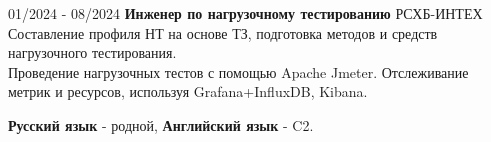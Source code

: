 \documentclass[9pt]{developercv} %
\begin{document}



\vspace{-10 pt}
\begin{entrylist}
    \entry
		{01/2024 - 08/2024}
		{{\textbf{Инженер по нагрузочному тестированию}}}
		{РСХБ-ИНТЕХ}
		{Составление профиля НТ на основе ТЗ, подготовка методов и средств нагрузочного тестирования.\\
            Проведение нагрузочных тестов с помощью Apache Jmeter. Отслеживание метрик и ресурсов, используя Grafana+InfluxDB, Kibana.
            }
\end{entrylist}
\vspace{-10 pt}
    \vspace{-6pt}
    
    \hspace{26mm}  \textbf{Русский язык} - родной, \textbf{Английский язык} - C2. 
\end{document}
